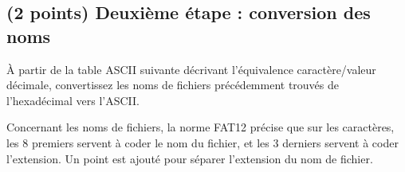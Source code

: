 \documentclass[11pt,a4paper]{article}
\begin{document}
\vspace*{-0.25cm}


\subsection{(2 points) Deuxième étape : conversion des noms }

\noindent À partir de la table ASCII suivante décrivant l'équivalence caractère/valeur décimale, convertissez les noms de fichiers précédemment trouvés de l'hexadécimal vers l'ASCII.

\smallskip

\noindent Concernant les noms de fichiers, la norme FAT12 précise que sur les caractères, les 8 premiers servent à coder le nom du fichier, et les 3 derniers servent à coder l'extension.
Un point est ajouté pour séparer l'extension du nom de fichier.

\medskip
\end{document}
